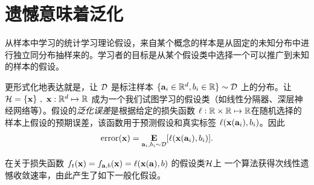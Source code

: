 \section{
	遗憾意味着泛化
	}

从样本中学习的统计学习理论假设，来自某个概念的样本是从固定的未知分布中进行独立同分布抽样来的。学习者的目标是从某个假设类中选择一个可以推广到未知的样本的假设。

更形式化地表达就是，让 ${\mathcal D}$ 是标注样本 $\{\mathbf{a}_i  \in {\mathbb R}^d, b_i \in {\mathbb R}\} \sim {\mathcal D}$ 上的分布。让 ${\mathcal H} = \{ \mathbf x \} \ , \ \mathbf x: {\mathbb R}^d \mapsto {\mathbb R}$ 成为一个我们试图学习的假设类（如线性分隔器、深层神经网络等）。假设的{\it 泛化误差}是根据给定的损失函数 $\ell : {\mathbb R} \times {\mathbb R} \mapsto {\mathbb R}$在随机选择的样本上假设的预期误差，该函数用于预测假设和真实标签 $\ell(\mathbf x(\mathbf{a}_i) , b_i)$。因此
$$ \mathop{\mbox{\rm error}}( \mathbf x) = \mathop{\mbox{\bf E}}_{\mathbf{a}_i , b_i \sim {\mathcal D}} [ \ell (\mathbf x(\mathbf{a}_i) , b_i ) ] .$$

在关于损失函数 $f_t(\mathbf x) = f_{\mathbf{a},b} (\mathbf x) = \ell( \mathbf x(\mathbf{a}) , b)$ 的假设类${\mathcal H}$上 一个算法获得次线性遗憾收敛速率，由此产生了如下一般化假设。

